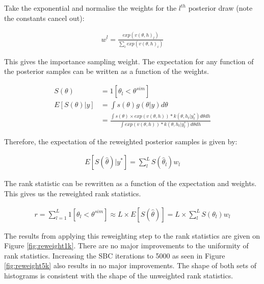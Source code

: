 \documentclass[12pt, a4paper]{article}
\begin{document}
    Take the exponential and normalise the weights for the $l^{th}$ posterior draw (note the constants cancel out):
    
    $$
    \begin{aligned}
    w^l = \frac{exp(v(\theta, h)_l)}{\sum_i exp(v(\theta, h)_i)}
    \end{aligned}
    $$

    This gives the importance sampling weight. The expectation for any function of the posterior samples can be written as a function of the weights.

    $$
    \begin{aligned}
    S(\theta) &= 1[\theta_l < \theta^{sim}] \\
    E[S(\theta) | y] &= \int s(\theta) g(\theta | y) d\theta\\ 
    &= \frac{\int s(\theta)\times exp(v(\theta, h)) * k(\theta, h_t | y^{\ast}_t)d\theta d h}{\int exp(v(\theta, h)) * k(\theta, h_t | y^{\ast}_t)d\theta d h} 
    \end{aligned}
    $$

    Therefore, the expectation of the reweighted posterior samples is given by:

    $$
    \begin{aligned}
    E[S(\hat{\theta}) | y^{\ast}] = \sum_l^L S(\hat{\theta}_l)w_l
    \end{aligned}
    $$

    The rank statistic can be rewritten as a function of the expectation and weights. This gives us the reweighted rank statistics.

    $$
    \begin{aligned}
    r = \sum_{l=1}^{L}1[\theta_{l} < \theta^{sim}] \approx  L\times E[S(\hat{\theta})] = L\times \sum_l^L S(\theta_l)w_l
    \end{aligned}
    $$

    The results from applying this reweighting step to the rank statistics are given on Figure \ref{fig:reweight1k}. There are no major improvements to the uniformity of rank statistics. Increasing the SBC iterations to 5000 as seen in Figure \ref{fig:reweight5k} also results in no major improvements. The shape of both sets of histograms is consistent with the shape of the unweighted rank statistics. 
\end{document}
